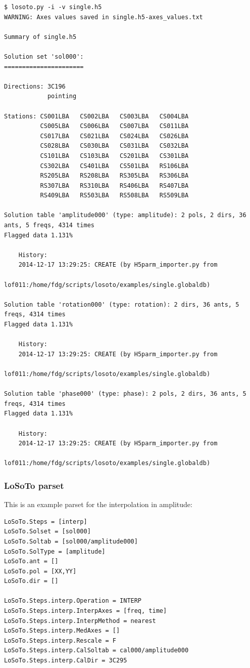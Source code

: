 \begin{verbatim}
$ losoto.py -i -v single.h5
WARNING: Axes values saved in single.h5-axes_values.txt

Summary of single.h5

Solution set 'sol000':
======================

Directions: 3C196
            pointing
            
Stations: CS001LBA   CS002LBA   CS003LBA   CS004LBA  
          CS005LBA   CS006LBA   CS007LBA   CS011LBA  
          CS017LBA   CS021LBA   CS024LBA   CS026LBA  
          CS028LBA   CS030LBA   CS031LBA   CS032LBA  
          CS101LBA   CS103LBA   CS201LBA   CS301LBA  
          CS302LBA   CS401LBA   CS501LBA   RS106LBA  
          RS205LBA   RS208LBA   RS305LBA   RS306LBA  
          RS307LBA   RS310LBA   RS406LBA   RS407LBA  
          RS409LBA   RS503LBA   RS508LBA   RS509LBA  
          
Solution table 'amplitude000' (type: amplitude): 2 pols, 2 dirs, 36 ants, 5 freqs, 4314 times
Flagged data 1.131%

    History:
    2014-12-17 13:29:25: CREATE (by H5parm_importer.py from
                         lof011:/home/fdg/scripts/losoto/examples/single.globaldb)

Solution table 'rotation000' (type: rotation): 2 dirs, 36 ants, 5 freqs, 4314 times
Flagged data 1.131%

    History:
    2014-12-17 13:29:25: CREATE (by H5parm_importer.py from
                         lof011:/home/fdg/scripts/losoto/examples/single.globaldb)

Solution table 'phase000' (type: phase): 2 pols, 2 dirs, 36 ants, 5 freqs, 4314 times
Flagged data 1.131%

    History:
    2014-12-17 13:29:25: CREATE (by H5parm_importer.py from
                         lof011:/home/fdg/scripts/losoto/examples/single.globaldb)
\end{verbatim}

\subsubsection{LoSoTo parset}
\label{losoto:parset}

This is an example parset for the interpolation in amplitude:
\begin{verbatim}
LoSoTo.Steps = [interp]
LoSoTo.Solset = [sol000]
LoSoTo.Soltab = [sol000/amplitude000]
LoSoTo.SolType = [amplitude]
LoSoTo.ant = []
LoSoTo.pol = [XX,YY]
LoSoTo.dir = []

LoSoTo.Steps.interp.Operation = INTERP
LoSoTo.Steps.interp.InterpAxes = [freq, time]
LoSoTo.Steps.interp.InterpMethod = nearest
LoSoTo.Steps.interp.MedAxes = []
LoSoTo.Steps.interp.Rescale = F
LoSoTo.Steps.interp.CalSoltab = cal000/amplitude000
LoSoTo.Steps.interp.CalDir = 3C295
\end{verbatim}

